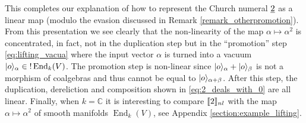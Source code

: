 \documentclass[english,letter paper,12pt,reqno]{article}
\DeclarePairedDelimiter\ket{\lvert}{\rangle}
\theoremstyle{example}
\numberwithin{equation}{section}
\DeclareMathOperator{\End}{End}
\begin{document}
This completes our explanation of how to represent the Church numeral $\underline{2}$ as a linear map (modulo the evasion discussed in Remark \ref{remark_otherpromotion}). From this presentation we see clearly that the non-linearity of the map $\alpha \mapsto \alpha^2$ is concentrated, in fact, not in the duplication step but in the ``promotion'' step \eqref{eq:lifting_vacua} where the input vector $\alpha$ is turned into a vacuum $\ket{o}_\alpha \in {!} \End_k(V)$. The promotion step is non-linear since $\ket{o}_\alpha + \ket{o}_\beta$ is not a morphism of coalgebras and thus cannot be equal to $\ket{o}_{\alpha + \beta}$. After this step, the duplication, dereliction and composition shown in \eqref{eq:2_deals_with_0} are all linear. Finally, when $k = \mathbb{C}$ it is interesting to compare $\llbracket 2 \rrbracket_{nl}$ with the map $\alpha \mapsto \alpha^2$ of smooth manifolds $\End_k(V)$, see Appendix \ref{section:example_lifting}.

\end{document}
